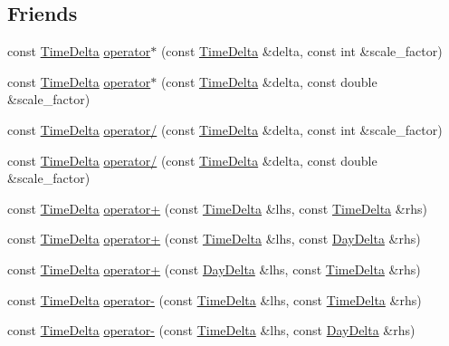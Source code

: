 \subsection*{Friends}
\begin{DoxyCompactItemize}
\item 
const \hyperlink{structTimeDelta}{Time\-Delta} \hyperlink{structTimeDelta_ab7a91eba5b4f059a62b8514db14fc53b}{operator$\ast$} (const \hyperlink{structTimeDelta}{Time\-Delta} \&delta, const int \&scale\-\_\-factor)
\item 
const \hyperlink{structTimeDelta}{Time\-Delta} \hyperlink{structTimeDelta_adab5720acc96114e1dc60fee9e515cb8}{operator$\ast$} (const \hyperlink{structTimeDelta}{Time\-Delta} \&delta, const double \&scale\-\_\-factor)
\item 
const \hyperlink{structTimeDelta}{Time\-Delta} \hyperlink{structTimeDelta_ad9091904936708075238c1211784ac72}{operator/} (const \hyperlink{structTimeDelta}{Time\-Delta} \&delta, const int \&scale\-\_\-factor)
\item 
const \hyperlink{structTimeDelta}{Time\-Delta} \hyperlink{structTimeDelta_aa3ef692470498914c3a3da20f5689333}{operator/} (const \hyperlink{structTimeDelta}{Time\-Delta} \&delta, const double \&scale\-\_\-factor)
\item 
const \hyperlink{structTimeDelta}{Time\-Delta} \hyperlink{structTimeDelta_ab9dcf443fb6dde4d15657f270e5f1111}{operator+} (const \hyperlink{structTimeDelta}{Time\-Delta} \&lhs, const \hyperlink{structTimeDelta}{Time\-Delta} \&rhs)
\item 
const \hyperlink{structTimeDelta}{Time\-Delta} \hyperlink{structTimeDelta_a8f6bef028089b857d7d4a1e14ab81d9a}{operator+} (const \hyperlink{structTimeDelta}{Time\-Delta} \&lhs, const \hyperlink{structDayDelta}{Day\-Delta} \&rhs)
\item 
const \hyperlink{structTimeDelta}{Time\-Delta} \hyperlink{structTimeDelta_adfb48eb9c656f4705fa593c8b58bc80f}{operator+} (const \hyperlink{structDayDelta}{Day\-Delta} \&lhs, const \hyperlink{structTimeDelta}{Time\-Delta} \&rhs)
\item 
const \hyperlink{structTimeDelta}{Time\-Delta} \hyperlink{structTimeDelta_a0298dd60abe0bb412961af7325925999}{operator-\/} (const \hyperlink{structTimeDelta}{Time\-Delta} \&lhs, const \hyperlink{structTimeDelta}{Time\-Delta} \&rhs)
\item 
const \hyperlink{structTimeDelta}{Time\-Delta} \hyperlink{structTimeDelta_ab4c141e3692561a153127782bda9a9f8}{operator-\/} (const \hyperlink{structTimeDelta}{Time\-Delta} \&lhs, const \hyperlink{structDayDelta}{Day\-Delta} \&rhs)

\end{DoxyCompactItemize}
